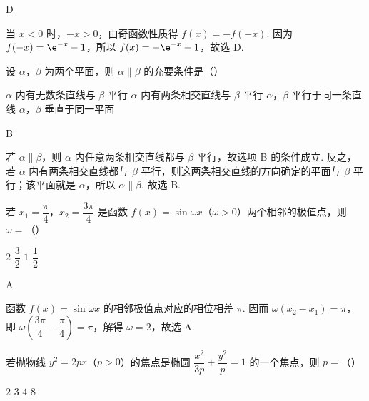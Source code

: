 \begin{answer}
D
\end{answer}

\begin{solution}
当 \(x<0\) 时，\(-x>0\)，由奇函数性质得 \(f(x)=-f(-x)\). 因为 \(f(-x)=\e^{-x}-1\)，所以 \(f(x)=-\e^{-x}+1\)，故选 D.
\end{solution}

\begin{problem}
设 \(\alpha\)，\(\beta\) 为两个平面，则 \(\alpha\parallel\beta\) 的充要条件是（\quad）

\choices
    {\(\alpha\) 内有无数条直线与 \(\beta\) 平行}
    {\(\alpha\) 内有两条相交直线与 \(\beta\) 平行}
    {\(\alpha\)，\(\beta\) 平行于同一条直线}
    {\(\alpha\)，\(\beta\) 垂直于同一平面}
\end{problem}

\begin{answer}
B
\end{answer}

\begin{solution}
若 \(\alpha\parallel\beta\)，则 \(\alpha\) 内任意两条相交直线都与 \(\beta\) 平行，故选项 B 的条件成立. 反之，若 \(\alpha\) 内有两条相交直线都与 \(\beta\) 平行，则这两条相交直线的方向确定的平面与 \(\beta\) 平行；该平面就是 \(\alpha\)，所以 \(\alpha\parallel\beta\). 故选 B.
\end{solution}

\begin{problem}
若 \(x_1=\dfrac{\pi}{4}\)，\(x_2=\dfrac{3\pi}{4}\) 是函数 \(f(x)=\sin\omega x\)（\(\omega>0\)）两个相邻的极值点，则 \(\omega=\)（\quad）

\choices
    {\(2\)}
    {\(\dfrac32\)}
    {\(1\)}
    {\(\dfrac12\)}
\end{problem}

\begin{answer}
A
\end{answer}

\begin{solution}
函数 \(f(x)=\sin\omega x\) 的相邻极值点对应的相位相差 \(\pi\). 因而 \(\omega(x_2-x_1)=\pi\)，即 \(\omega\left(\dfrac{3\pi}{4}-\dfrac{\pi}{4}\right)=\pi\)，解得 \(\omega=2\)，故选 A.
\end{solution}

\begin{problem}
若抛物线 \(y^2=2px\)（\(p>0\)）的焦点是椭圆 \(\dfrac{x^2}{3p}+\dfrac{y^2}{p}=1\) 的一个焦点，则 \(p=\)（\quad）

\choices
    {\(2\)}
    {\(3\)}
    {\(4\)}
    {\(8\)}
\end{problem}

